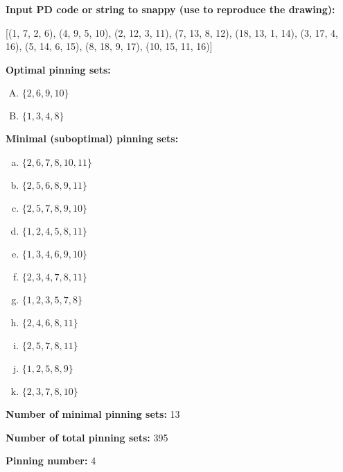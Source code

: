 \documentclass{article}%
\begin{document}
%
\small

\begin{multicols}{2}

\columnbreak

\noindent\textbf{Input PD code or string to snappy (use to reproduce the drawing):}

	[(1, 7, 2, 6), (4, 9, 5, 10), (2, 12, 3, 11), (7, 13, 8, 12), (18, 13, 1, 14), (3, 17, 4, 16), (5, 14, 6, 15), (8, 18, 9, 17), (10, 15, 11, 16)]

\noindent\textbf{Optimal pinning sets:}

\begin{enumerate}[A)]
\item{\Huge\textcolor{red0}{\textbullet}}$\{2,6,9,10\}$

\item{\Huge\textcolor{red5}{\textbullet}}$\{1,3,4,8\}$

\end{enumerate}
\textbf{Minimal (suboptimal) pinning sets:}

\begin{enumerate}[a)]
\item{\Huge\textcolor{green0}{\textbullet}}$\{2,6,7,8,10,11\}$

\item{\Huge\textcolor{green1}{\textbullet}}$\{2,5,6,8,9,11\}$

\item{\Huge\textcolor{green3}{\textbullet}}$\{2,5,7,8,9,10\}$

\item{\Huge\textcolor{green5}{\textbullet}}$\{1,2,4,5,8,11\}$

\item{\Huge\textcolor{green6}{\textbullet}}$\{1,3,4,6,9,10\}$

\item{\Huge\textcolor{green8}{\textbullet}}$\{2,3,4,7,8,11\}$

\item{\Huge\textcolor{green10}{\textbullet}}$\{1,2,3,5,7,8\}$

\item{\Huge\textcolor{green12}{\textbullet}}$\{2,4,6,8,11\}$

\item{\Huge\textcolor{green13}{\textbullet}}$\{2,5,7,8,11\}$

\item{\Huge\textcolor{green15}{\textbullet}}$\{1,2,5,8,9\}$

\item{\Huge\textcolor{green17}{\textbullet}}$\{2,3,7,8,10\}$

\end{enumerate}


\noindent\textbf{Number of minimal pinning sets:} 13

\noindent\textbf{Number of total pinning sets:} 395

\noindent\textbf{Pinning number:} 4


\end{multicols}
\end{document}
